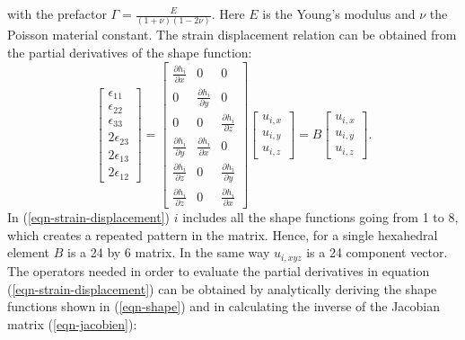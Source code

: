with the prefactor $\Gamma = \frac{E}{(1+\nu)(1-2\nu)}$. Here $E$ is
the Young's modulus and $\nu$ the Poisson material constant.
The strain displacement relation can be obtained from the partial
derivatives of the shape function:
\begin{equation}
  \left[\begin{array}{c}
      \epsilon_{11} \\ \epsilon_{22} \\ \epsilon_{33} \\ 2\epsilon_{23} \\
      2\epsilon_{13} \\ 2\epsilon_{12}
    \end{array}
    \right] = \left[\begin{array}{ccc}
      \frac{\partial h_i}{\partial x} & 0 & 0 \\
      0 & \frac{\partial h_i}{\partial y} & 0 \\
      0 & 0 & \frac{\partial h_i}{\partial z} \\
      \frac{\partial h_i}{\partial y} &
      \frac{\partial h_i}{\partial x} & 0 \\
      \frac{\partial h_i}{\partial z} & 0 &
      \frac{\partial h_i}{\partial y} \\
      \frac{\partial h_i}{\partial z} & 0 & \frac{\partial h_i}{\partial x}
    \end{array}
    \right] \left[\begin{array}{c} u_{i,x} \\ u_{i,y}
      \\ u_{i,z} \end{array}\right] =
  B
  \left[\begin{array}{c} u_{i,x} \\ u_{i,y}
      \\ u_{i,z} \end{array}\right].
  \label{eqn-strain-displacement}
\end{equation}
In (\ref{eqn-strain-displacement}) $i$ includes all the shape functions
going from 1 to 8, which
creates a repeated pattern in the matrix. Hence, for a single
hexahedral element $B$ is a 24 by 6 matrix. In the same way $u_{i,xyz}$
is a 24 component vector. The operators needed in
order to evaluate the partial derivatives in equation
(\ref{eqn-strain-displacement}) can be obtained by analytically
deriving the shape functions shown in (\ref{eqn-shape}) 
and in calculating the inverse of the Jacobian matrix (\ref{eqn-jacobien}):

